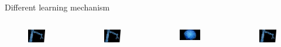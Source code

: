 \documentclass[12pt]{beamer}
\begin{document}
\begin{frame}{Different learning mechanism}
\begin{columns}
     {
        \begin{figure}
        \includegraphics[scale=0.3]{Figures/MachineArm.jpg}
        \end{figure}}
         {
        \begin{figure}
        \includegraphics[scale=0.3]{Figures/MachineArm.jpg}
        \end{figure}
        \begin{figure}
        \includegraphics[scale=0.3]{Figures/Compute.jpg}
        \end{figure}}
                 {
        \begin{figure}
        \includegraphics[scale=0.3]{Figures/MachineArm.jpg}

\end{figure}}
\end{columns}
\end{frame}
\end{document}
